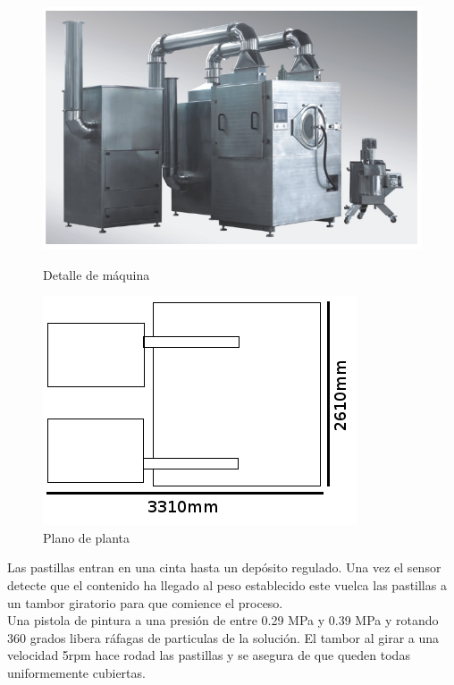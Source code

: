 	\begin{figure}[htp]
		\begin{minipage}{.48\textwidth}
			\centering
			\includegraphics[scale=0.3]{Datasheets/4Foto.png}
			\caption{Detalle de máquina}
			\label{fig:testa}
		\end{minipage}
		\begin{minipage}{.48\textwidth}
			\centering
			\includegraphics[scale=0.6]{Datasheets/Miniaturas/revestimiento.png}
			\caption{Plano de planta}
			\label{fig:testb}
		\end{minipage}
	\end{figure}

	
	

	Las pastillas entran en una cinta hasta un depósito regulado. Una vez el sensor detecte que el contenido ha llegado al peso establecido este vuelca las pastillas a un tambor giratorio para que comience el proceso.\\

	Una pistola de pintura a una presión de entre 0.29 MPa y 0.39 MPa y rotando 360 grados libera ráfagas de particulas de la solución. El tambor al girar a una velocidad 5rpm hace rodad las pastillas y se asegura de que queden todas uniformemente cubiertas.\\

